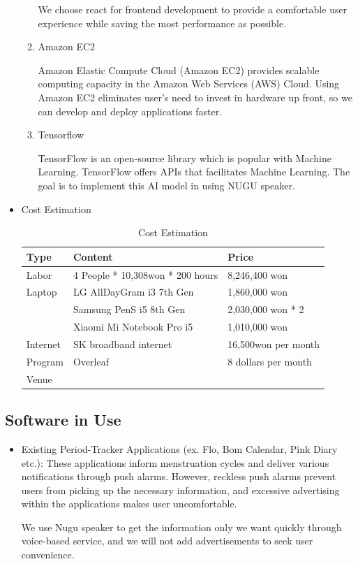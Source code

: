 \documentclass[conference]{IEEEtran}
\begin{document}
\begin{itemize}
\begin{enumerate}
        We choose react for frontend development to provide a comfortable user experience while saving the most performance as possible.
        \item Amazon EC2
        
        Amazon Elastic Compute Cloud (Amazon EC2) provides scalable computing capacity in the Amazon Web Services (AWS) Cloud. Using Amazon EC2 eliminates user’s need to invest in hardware up front, so we can develop and deploy applications faster. \cite{b7}
        \item Tensorflow
        
        TensorFlow is an open-source library which is popular with Machine Learning. TensorFlow offers APIs that facilitates Machine Learning.
        The goal is to implement this AI model in using NUGU speaker.
    \end{enumerate}
\end{itemize}

\begin{itemize}
    \item Cost Estimation
\begin{table}[h]
\centering
\caption{Cost Estimation}
\begin{tabular}[t]{p{0.8cm}p{3.4cm}p{2.5cm}}
\toprule
Type&Content&Price\\
\midrule
Labor&4 People * 10,308won * 200 hours&8,246,400 won\\
\rule{0in}{3ex}Laptop&LG AllDayGram i3 7th Gen&1,860,000 won\\
\rule{0in}{2ex}&Samsung PenS i5 8th Gen&2,030,000 won * 2\\
\rule{0in}{2ex}&Xiaomi Mi Notebook Pro i5&1,010,000 won\\
\rule{0in}{3ex}Internet&SK broadband internet&16,500won per month\\
\rule{0in}{3ex}Program&Overleaf&8 dollars per month\\
\rule{0in}{3ex}Venue&&\\
\bottomrule
\end{tabular}
\end{table}%

\end{itemize}
\subsection{Software in Use}
\begin{itemize}
    \setlength{\parindent}{2ex}
    \item Existing Period-Tracker Applications (ex. Flo, Bom Calendar, Pink Diary etc.): These applications inform menstruation cycles and deliver various notifications through push alarms. However, reckless push alarms prevent users from picking up the necessary information, and excessive advertising within the applications makes user uncomfortable.
    
    We use Nugu speaker to get the information only we want quickly through voice-based service, and we will not add advertisements to seek user convenience.
\end{itemize}
\end{document}
